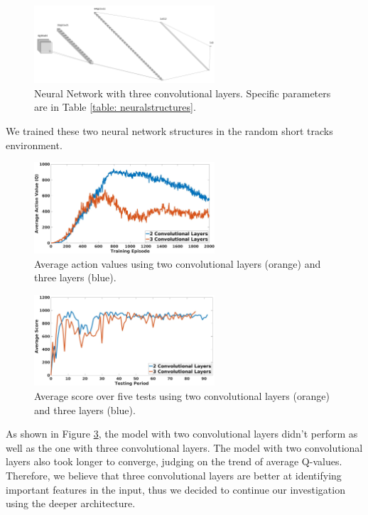 \begin{figure}[h]
\centering
\includegraphics[width=0.6\textwidth]{Graphics/nn_crop3.png}
\caption[Three Convolutional Neural Network Structure]{Neural Network
  with three convolutional layers. Specific parameters are in Table
  \ref{table: neuralstructures}.} 
\label{fig:3conv}
\end{figure}

We trained these two neural network structures in the random short
tracks environment.  

\begin{figure}[h]
\centering
\includegraphics[width=0.6\textwidth]{Graphics/AveQ_conv.jpg}
\caption[Average Action Values Neural Network Structure
  Comparison]{Average action values using two convolutional layers
  (orange) and three layers (blue).} 
\label{fig:conv_aveq}
\end{figure}

\begin{figure}[h]
\centering
\includegraphics[width=0.6\textwidth]{Graphics/TestScore_conv.jpg}
\caption[Average Test Score Neural Network Structure
  Comparison]{Average score over five tests using two convolutional
  layers (orange) and three layers (blue).} 
\label{fig:conv_test}
\end{figure}

As shown in Figure \ref{fig:conv_test}, the model with two
convolutional layers didn't perform as well as the one with three
convolutional layers. The model with two convolutional layers also
took longer to converge, judging on the trend of average
Q-values. Therefore, we believe that three convolutional layers are
better at identifying important features in the input, thus we decided
to continue our investigation using the deeper architecture. 

